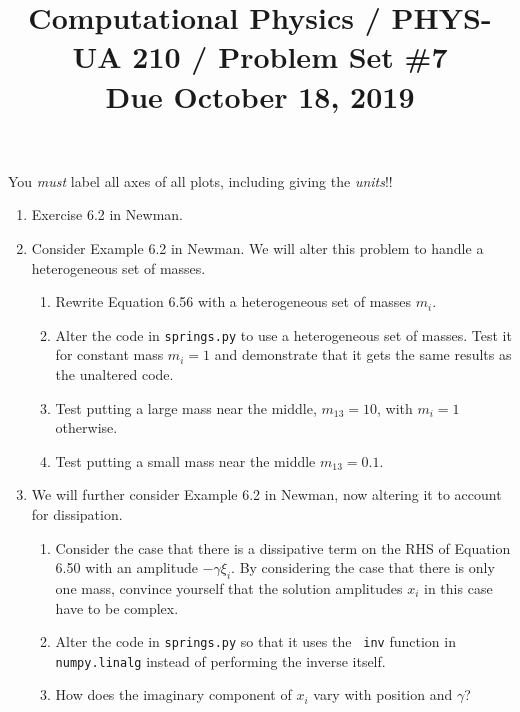 \documentclass[11pt, preprint]{aastex}
\begin{document}
\title{\bf Computational Physics / PHYS-UA 210 / Problem Set \#7
\\ Due October 18, 2019 }

You {\it must} label all axes of all plots, including giving the {\it
  units}!!

\begin{enumerate}
\item Exercise 6.2 in Newman.
\item Consider Example 6.2 in Newman. We will alter this problem to
  handle a heterogeneous set of masses.
  \begin{enumerate}
    \item Rewrite Equation 6.56 with a heterogeneous set of masses
      $m_i$. 
    \item Alter the code in {\tt springs.py} to use a heterogeneous
      set of masses. Test it for constant mass $m_i = 1$ and
      demonstrate that it gets the same results as the unaltered code.
    \item Test putting a large mass near the middle, $m_{13} = 10$,
      with $m_i = 1$ otherwise. 
    \item Test putting a small mass near the middle $m_{13} = 0.1$.
  \end{enumerate}
\item We will further consider Example 6.2 in Newman, now altering it
  to account for dissipation. 
  \begin{enumerate}
    \item Consider the case that there is a dissipative term on the
      RHS of Equation 6.50 with an amplitude $-\gamma \xi_i$. By
      considering the case that there is only one mass, convince
      yourself that the solution amplitudes $x_i$ in this case have to
      be complex.
    \item Alter the code in {\tt springs.py} so that it uses the {\tt
      inv} function in {\tt numpy.linalg} instead of performing the
      inverse itself.
    \item How does the imaginary component of $x_i$ vary with
      position and $\gamma$?
  \end{enumerate}
\end{enumerate}
\end{document}
